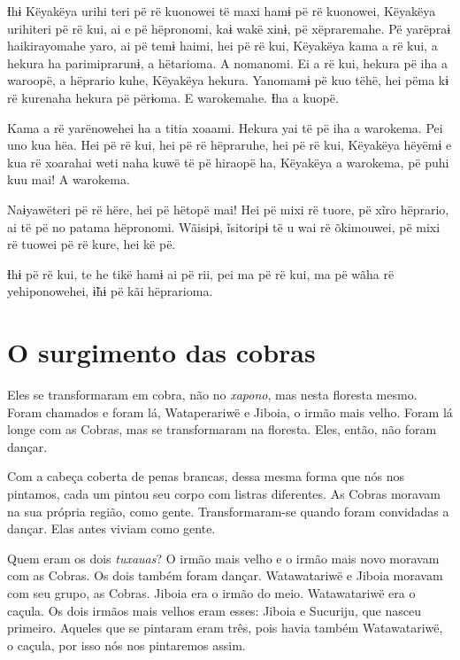 Ɨhɨ Këyakëya urihi teri pë rë kuonowei të maxi hamɨ pë rë kuonowei,
 Këyakëya urihiteri pë rë kui, ai e pë hëpronomi, kaɨ wakë xinɨ, pë
 xëpraremahe. Pë yarëpraɨ haikirayomahe yaro, ai pë temɨ haimi, hei pë rë
 kui, Këyakëya kama a rë kui, a hekura ha parimiprarunɨ, a hëtarioma. A nomanomi. Ei a rë kui, hekura pë iha a waroopë, a hëprario kuhe,
 Këyakëya hekura. Yanomamɨ pë kuo tëhë, hei pëma kɨ rë kurenaha hekura pë
 përɨoma. E warokemahe. Ɨha a kuopë. 

Kama a rë yarënowehei ha a titia xoaami. Hekura yai të pë iha a
warokema. Pei uno kua hëa. Hei pë rë kui, hei pë rë hëpraruhe, hei pë rë
kui, Këyakëya hëyëmɨ e kua rë xoarahai weti naha kuwë të pë hiraopë ha,
Këyakëya a warokema, pë puhi kuu mai! A warokema. 

Naɨyawëteri pë rë hëre, hei pë hëtopë mai! Hei pë mixi rë tuore, pë xĩro
 hëprario, ai të pë no patama hëpronomi. Wãisipɨ, ĩsitoripɨ të u wai rë
 õkimouwei, pë mixi rë tuowei pë rë kure, hei kë pë. 

Ɨhɨ pë rë kui, te he tikë hamɨ ai pë rii, pei ma pë rë kui, ma pë wãha
rë yehiponowehei, ɨ̃hɨ pë kãi hëprarioma.

\chapter{O surgimento das cobras}
 
 

Eles se transformaram em cobra, não no \textit{xapono}, mas nesta floresta mesmo.
Foram chamados e foram lá, Wataperariwë e Jiboia, o irmão mais velho.
Foram lá longe com as Cobras, mas se transformaram na floresta. Eles,
então, não foram dançar. 

Com a cabeça coberta de penas brancas, dessa mesma forma que nós nos
 pintamos, cada um pintou seu corpo com listras diferentes. As Cobras
 moravam na sua própria região, como gente. Transformaram-se quando
 foram convidadas a dançar. Elas antes viviam como gente. 

Quem eram os dois \textit{tuxauas}? O irmão mais velho e o irmão mais novo
 moravam com as Cobras. Os dois também foram dançar. Watawatariwë e
 Jiboia moravam com seu grupo, as Cobras. Jiboia era o irmão do meio.
 Watawatariwë era o caçula. Os dois irmãos mais velhos eram esses: Jiboia
 e Sucuriju, que nasceu primeiro. Aqueles que se pintaram eram três, pois
 havia também Watawatariwë, o caçula, por isso nós nos pintaremos assim.

